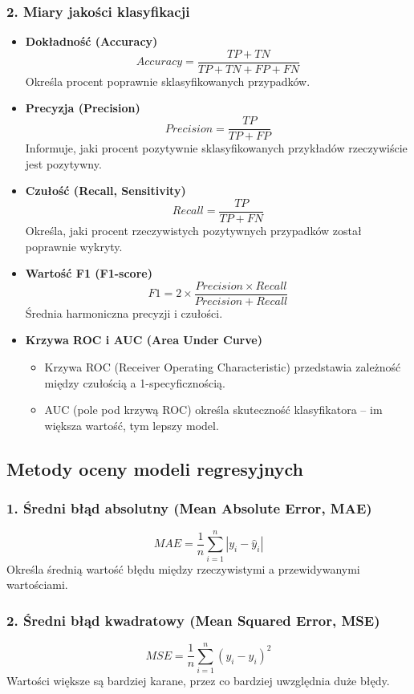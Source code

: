\subsubsection{2. Miary jakości klasyfikacji}
\begin{itemize}
    \item \textbf{Dokładność (Accuracy)}
    \[
    Accuracy = \frac{TP + TN}{TP + TN + FP + FN}
    \]
    Określa procent poprawnie sklasyfikowanych przypadków.

    \item \textbf{Precyzja (Precision)}
    \[
    Precision = \frac{TP}{TP + FP}
    \]
    Informuje, jaki procent pozytywnie sklasyfikowanych przykładów rzeczywiście jest pozytywny.

    \item \textbf{Czułość (Recall, Sensitivity)}
    \[
    Recall = \frac{TP}{TP + FN}
    \]
    Określa, jaki procent rzeczywistych pozytywnych przypadków został poprawnie wykryty.

    \item \textbf{Wartość F1 (F1-score)}
    \[
    F1 = 2 \times \frac{Precision \times Recall}{Precision + Recall}
    \]
    Średnia harmoniczna precyzji i czułości.

    \item \textbf{Krzywa ROC i AUC (Area Under Curve)}
    \begin{itemize}
        \item Krzywa ROC (Receiver Operating Characteristic) przedstawia zależność między czułością a 1-specyficznością.
        \item AUC (pole pod krzywą ROC) określa skuteczność klasyfikatora – im większa wartość, tym lepszy model.
    \end{itemize}
\end{itemize}

\subsection{Metody oceny modeli regresyjnych}

\subsubsection{1. Średni błąd absolutny (Mean Absolute Error, MAE)}
\[
MAE = \frac{1}{n} \sum_{i=1}^{n} | y_i - \hat{y}_i |
\]
Określa średnią wartość błędu między rzeczywistymi a przewidywanymi wartościami.

\subsubsection{2. Średni błąd kwadratowy (Mean Squared Error, MSE)}
\[
MSE = \frac{1}{n} \sum_{i=1}^{n} (y_i - \hat{y}_i)^2
\]
Wartości większe są bardziej karane, przez co bardziej uwzględnia duże błędy.

